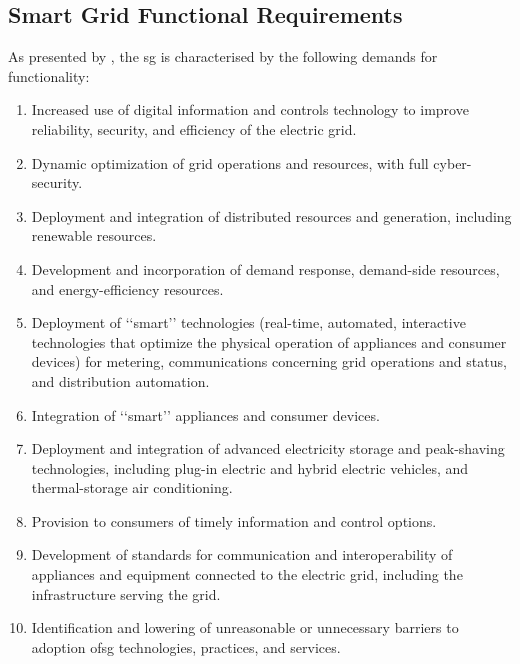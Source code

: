 






\subsection{Smart Grid Functional Requirements}


As presented by \cite{EnIndSecAct2007}, the \acrlong{sg} is characterised by the following demands for functionality:

\begin{enumerate}
\item Increased use of digital information and controls technology to improve reliability, security, and efficiency of the
electric grid.
\item Dynamic optimization of grid operations and resources,
with full cyber-security.
\item Deployment and integration of distributed resources
and generation, including renewable resources.
\item Development and incorporation of demand response,
demand-side resources, and energy-efficiency resources.
\item Deployment of ‘‘smart’’ technologies (real-time, automated, interactive technologies that optimize the physical operation of appliances and consumer devices) for metering, communications concerning grid operations and status, and distribution automation.
\item Integration of ‘‘smart’’ appliances and consumer devices.
\item Deployment and integration of advanced electricity storage and peak-shaving technologies, including plug-in electric
and hybrid electric vehicles, and thermal-storage air conditioning.
\item Provision to consumers of timely information and control
options.
\item Development of standards for communication and interoperability of appliances and equipment connected to the electric grid, including the infrastructure serving the grid.
\item Identification and lowering of unreasonable or unnecessary barriers to adoption of\acrlong{sg} technologies, practices,
and services. 

\end{enumerate}

